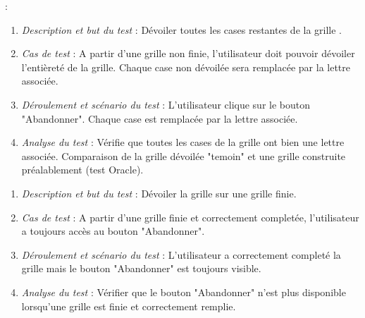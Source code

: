 \documentclass [ 11 pt ] {article}
\begin{document}
 :
 \begin{tcolorbox}[colback=positifC]
            \begin{enumerate}
                \item \textit{Description et but du test} : Dévoiler toutes les cases restantes de la grille .\newline
                
                \item \textit{Cas de test} : A partir d'une grille non finie, l'utilisateur doit pouvoir dévoiler l'entièreté de la grille. Chaque case non dévoilée sera remplacée par la lettre associée.   \newline
                
                \item \textit{Déroulement et scénario du test} : L'utilisateur clique sur le bouton "Abandonner". Chaque case est remplacée par la lettre associée. \newline
                
                \item \textit{Analyse du test} : Vérifie que toutes les cases de la grille ont bien une lettre associée. Comparaison de la grille dévoilée "temoin" et une grille construite préalablement (test Oracle).
            \end{enumerate}
        \end{tcolorbox}
        
        \begin{tcolorbox}
            \begin{enumerate}
                \item \textit{Description et but du test} : Dévoiler la grille sur une grille finie.\newline
                
                \item \textit{Cas de test} : A partir d'une grille  finie et correctement completée, l'utilisateur a toujours accès au bouton "Abandonner". \newline
                
                \item \textit{Déroulement et scénario du test} : L'utilisateur a correctement completé la grille mais le bouton "Abandonner" est toujours visible. \newline
                
                \item \textit{Analyse du test} : Vérifier que le bouton "Abandonner" n'est plus disponible lorsqu'une grille est finie et correctement remplie.
            \end{enumerate}
        \end{tcolorbox}
\end{document}
